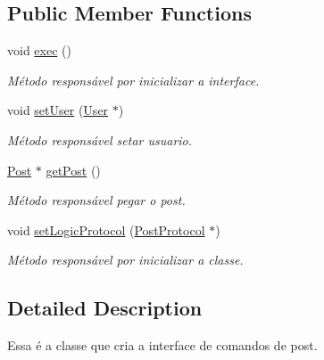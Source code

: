 \subsection*{Public Member Functions}
\begin{DoxyCompactItemize}
\item 
\hypertarget{class_post_controler_a4efc16938c3ca876209f780b328281ba}{void \hyperlink{class_post_controler_a4efc16938c3ca876209f780b328281ba}{exec} ()}\label{class_post_controler_a4efc16938c3ca876209f780b328281ba}

\begin{DoxyCompactList}\small\item\em Método responsável por inicializar a interface. \end{DoxyCompactList}\item 
\hypertarget{class_post_controler_ac678a38c6e956c00b595224e366e1db7}{void \hyperlink{class_post_controler_ac678a38c6e956c00b595224e366e1db7}{set\-User} (\hyperlink{class_user}{User} $\ast$)}\label{class_post_controler_ac678a38c6e956c00b595224e366e1db7}

\begin{DoxyCompactList}\small\item\em Método responsável setar usuario. \end{DoxyCompactList}\item 
\hypertarget{class_post_controler_adf9167af1d789a53824bd5fda74017ad}{\hyperlink{class_post}{Post} $\ast$ \hyperlink{class_post_controler_adf9167af1d789a53824bd5fda74017ad}{get\-Post} ()}\label{class_post_controler_adf9167af1d789a53824bd5fda74017ad}

\begin{DoxyCompactList}\small\item\em Método responsável pegar o post. \end{DoxyCompactList}\item 
\hypertarget{class_post_controler_a6a1ce212839f2dad093a728cde58afce}{void \hyperlink{class_post_controler_a6a1ce212839f2dad093a728cde58afce}{set\-Logic\-Protocol} (\hyperlink{class_post_protocol}{Post\-Protocol} $\ast$)}\label{class_post_controler_a6a1ce212839f2dad093a728cde58afce}

\begin{DoxyCompactList}\small\item\em Método responsável por inicializar a classe. \end{DoxyCompactList}\end{DoxyCompactItemize}


\subsection{Detailed Description}
Essa é a classe que cria a interface de comandos de post. 


